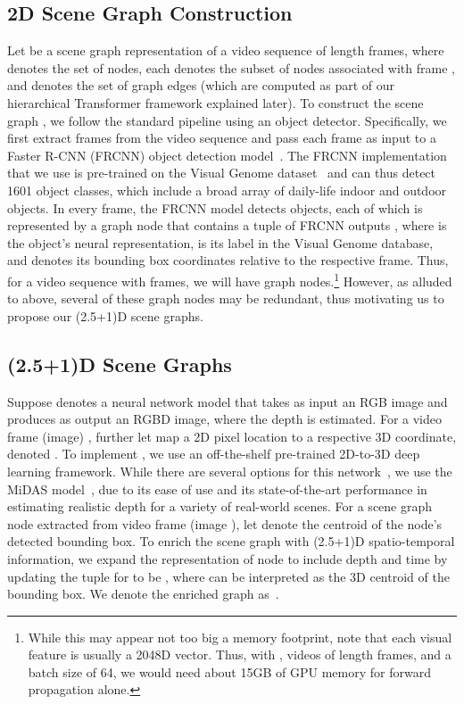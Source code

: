 \documentclass[letterpaper]{article} \usepackage{aaai22}  \usepackage{times}  \usepackage{helvet}  \usepackage{courier}  \usepackage[hyphens]{url}  \usepackage{graphicx} \urlstyle{rm} \def\UrlFont{\rm}  \usepackage{natbib}  \usepackage{caption} \DeclareCaptionStyle{ruled}{labelfont=normalfont,labelsep=colon,strut=off} \frenchspacing  \setlength{\pdfpagewidth}{8.5in}  \setlength{\pdfpageheight}{11in}  \usepackage{algorithm}
\newcommand{\name}{(2.5+1)D\xspace}
\begin{document}
\subsection{2D Scene Graph Construction}
Let  be a scene graph representation of a video sequence  of length  frames, where  denotes the set of nodes, each  denotes the subset of nodes associated with frame , and  denotes the set of graph edges (which are computed as part of our hierarchical Transformer framework explained later). To construct the scene graph , we follow the standard pipeline using an object detector. Specifically, we first extract frames from the video sequence and pass each frame as input to a Faster R-CNN (FRCNN) object detection model~\cite{ren2015faster}. The FRCNN implementation that we use is pre-trained on the Visual Genome dataset~\cite{anderson2018bottom} and can thus detect 1601 object classes, which include a broad array of daily-life indoor and outdoor objects. In every frame, the FRCNN model detects  objects, each of which is represented by a graph node  that contains a tuple of FRCNN outputs , where  is the object's neural representation,  is its label in the Visual Genome database, and  denotes its bounding box coordinates relative to the respective frame. Thus, for a video sequence with  frames, we will have  graph nodes.\footnote{While this may appear not too big a memory footprint, note that each visual feature  is usually a 2048D vector. Thus, with , videos of length  frames, and a batch size of 64, we would need about 15GB of GPU memory for forward propagation alone.} However, as alluded to above, several of these graph nodes may be redundant, thus motivating us to propose our \name scene graphs.


\subsection{\name Scene Graphs}
Suppose  denotes a neural network model that takes as input an RGB image and produces as output an RGBD image, where the depth is estimated. For a video frame (image) , further let  map a 2D pixel location  to a respective 3D coordinate, denoted . To implement , we use an off-the-shelf pre-trained 2D-to-3D deep learning framework. While there are several options for this network~\cite{fu2018deep,li2020unsupervised}, we use the MiDAS model~\cite{ranftl2019towards}, due to its ease of use and its state-of-the-art performance in estimating realistic depth for a variety of real-world scenes. 
For a scene graph node  extracted from video frame  (image ), let  denote the centroid of the node's detected bounding box. To enrich the scene graph with \name spatio-temporal information, we expand the representation of node  to include depth and time by updating the tuple for  to be , where  can be interpreted as the 3D centroid of the bounding box.
We denote the enriched graph as~.
\end{document}

